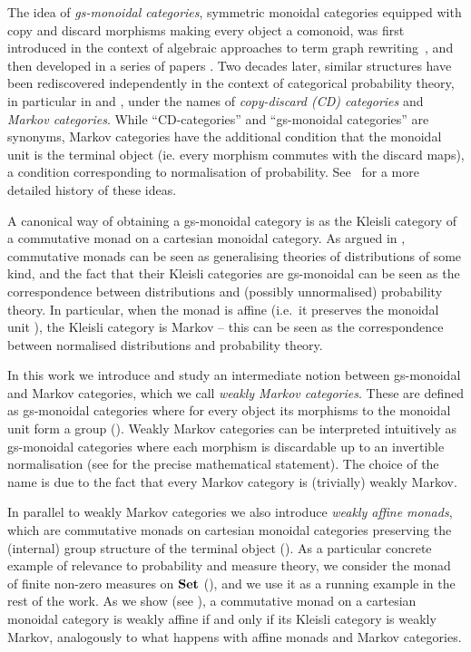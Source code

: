 \documentclass[a4paper,UKenglish,numberwithinsect,cleveref, autoref, thm-restate]{lipics-v2021}
\theoremstyle{plain} %
\theoremstyle{definition} %
\begin{document}
The idea of \emph{gs-monoidal categories}, symmetric monoidal categories equipped with copy and discard morphisms making every object a comonoid,
was first introduced in the context of algebraic approaches to term graph rewriting~\cite{CorradiniGadducci97}, and then
developed in a series of papers \cite{CorradiniGadducci99, CorradiniGadducci99b, CorradiniGadducci02}.
Two decades later, similar structures have been rediscovered independently in the context of categorical probability theory, in particular in \cite{cho_jacobs_2019} 
and \cite{Fritz_2020}, under the names of \emph{copy-discard (CD) categories} and \emph{Markov categories}.
While ``CD-categories'' and ``gs-monoidal categories'' are synonyms, Markov categories have the additional condition that the monoidal unit is the terminal object
(ie. every morphism commutes with the discard maps), a condition corresponding to normalisation of probability. See~\cite[Remark~2.2]{fritz2022} 
for a more detailed history of these ideas. 

A canonical way of obtaining a gs-monoidal category is as the Kleisli category of a commutative monad on a cartesian monoidal category. 
As argued in \cite{kock2012distributions}, commutative monads can be seen as generalising theories of distributions of some kind, and the fact that their Kleisli categories are gs-monoidal can be seen as the correspondence between distributions and (possibly unnormalised) probability theory.
In particular, when the monad is affine (i.e.~it preserves the monoidal unit \cite{Kock71,Jacobs1994}), the Kleisli category is Markov -- this can be seen as the correspondence between normalised distributions and probability theory.

In this work we introduce and study an intermediate notion between gs-monoidal and Markov categories, which we call \emph{weakly Markov categories}. 
These are defined as gs-monoidal categories where for every object its morphisms to the monoidal unit form a group (). 
Weakly Markov categories can be interpreted intuitively as gs-monoidal categories where each morphism is discardable up to an invertible normalisation (see  for the precise mathematical statement). The choice of the name is due to the fact that every Markov category is (trivially) weakly Markov.

In parallel to weakly Markov categories we also introduce \emph{weakly affine monads}, which are commutative monads on cartesian monoidal categories preserving the (internal) group structure of the terminal object ().
As a particular concrete example of relevance to probability and measure theory, we consider the monad of finite non-zero measures on $\mathbf{Set}$ (), and we use it as a running example in the rest of the work.
As we show (see ), a commutative monad on a cartesian monoidal category is weakly affine if and only if its Kleisli category is weakly Markov, analogously to what happens with affine monads and Markov categories. 
\end{document}
